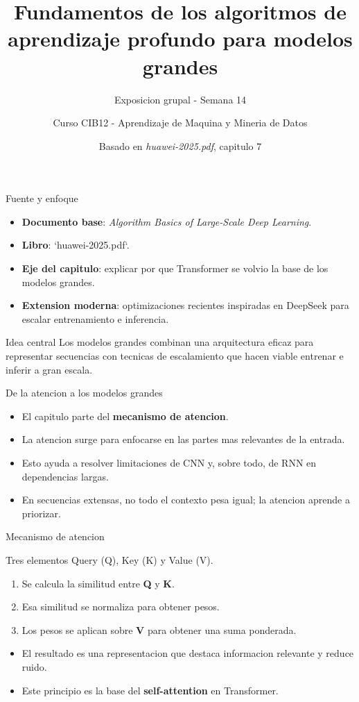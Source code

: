 \documentclass[aspectratio=169]{beamer}
\title{Fundamentos de los algoritmos de aprendizaje profundo para modelos grandes}
\subtitle{Exposicion grupal - Semana 14}
\author{Curso CIB12 - Aprendizaje de Maquina y Mineria de Datos}
\institute{Grupo 6}
\date{Basado en \textit{huawei-2025.pdf}, capitulo 7}
\begin{document}
\begin{frame}
  \titlepage
\end{frame}

\begin{frame}{Fuente y enfoque}
  \begin{itemize}
    \item \textbf{Documento base}: \textit{Algorithm Basics of Large-Scale Deep Learning}.
    \item \textbf{Libro}: `huawei-2025.pdf`.
    \item \textbf{Eje del capitulo}: explicar por que Transformer se volvio la base de los modelos grandes.
    \item \textbf{Extension moderna}: optimizaciones recientes inspiradas en DeepSeek para escalar entrenamiento e inferencia.
  \end{itemize}
  \vspace{0.2cm}
  \begin{block}{Idea central}
    Los modelos grandes combinan una arquitectura eficaz para representar secuencias con tecnicas de escalamiento que hacen viable entrenar e inferir a gran escala.
  \end{block}
\end{frame}

\begin{frame}{De la atencion a los modelos grandes}
  \begin{itemize}
    \item El capitulo parte del \textbf{mecanismo de atencion}.
    \item La atencion surge para enfocarse en las partes mas relevantes de la entrada.
    \item Esto ayuda a resolver limitaciones de CNN y, sobre todo, de RNN en dependencias largas.
    \item En secuencias extensas, no todo el contexto pesa igual; la atencion aprende a priorizar.
  \end{itemize}
\end{frame}

\begin{frame}{Mecanismo de atencion}
  \begin{block}{Tres elementos}
    Query (Q), Key (K) y Value (V).
  \end{block}
  \begin{enumerate}
    \item Se calcula la similitud entre \textbf{Q} y \textbf{K}.
    \item Esa similitud se normaliza para obtener pesos.
    \item Los pesos se aplican sobre \textbf{V} para obtener una suma ponderada.
  \end{enumerate}
  \vspace{0.2cm}
  \begin{itemize}
    \item El resultado es una representacion que destaca informacion relevante y reduce ruido.
    \item Este principio es la base del \textbf{self-attention} en Transformer.
  \end{itemize}
\end{frame}
\end{document}
